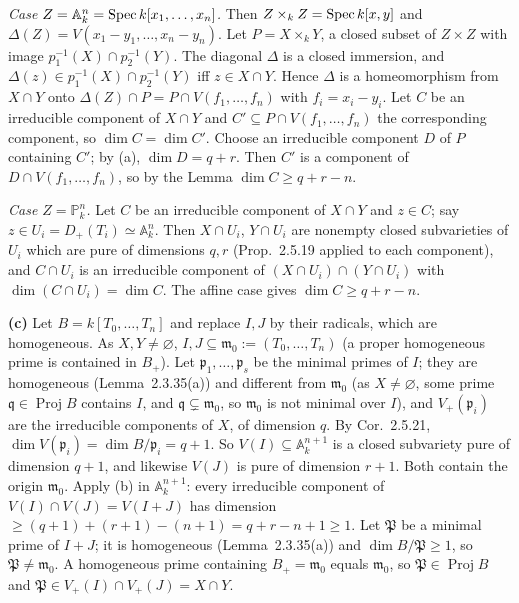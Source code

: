 \documentclass[11pt]{article}
\begin{document}
\emph{Case $Z=\mathbb A^n_k=\operatorname{Spec} k[x_1,\dots,x_n]$.} Then $Z\times_kZ=\operatorname{Spec} k[x,y]$ and $\Delta(Z)=V(x_1-y_1,\dots,x_n-y_n)$. Let $P=X\times_kY$, a closed subset of $Z\times Z$ with image $p_1^{-1}(X)\cap p_2^{-1}(Y)$. The diagonal $\Delta$ is a closed immersion, and $\Delta(z)\in p_1^{-1}(X)\cap p_2^{-1}(Y)$ iff $z\in X\cap Y$. Hence $\Delta$ is a homeomorphism from $X\cap Y$ onto $\Delta(Z)\cap P=P\cap V(f_1,\dots,f_n)$ with $f_i=x_i-y_i$. Let $C$ be an irreducible component of $X\cap Y$ and $C'\subseteq P\cap V(f_1,\dots,f_n)$ the corresponding component, so $\dim C=\dim C'$. Choose an irreducible component $D$ of $P$ containing $C'$; by (a), $\dim D=q+r$. Then $C'$ is a component of $D\cap V(f_1,\dots,f_n)$, so by the Lemma $\dim C\ge q+r-n$.

\emph{Case $Z=\mathbb P^n_k$.} Let $C$ be an irreducible component of $X\cap Y$ and $z\in C$; say $z\in U_i=D_+(T_i)\simeq\mathbb A^n_k$. Then $X\cap U_i$, $Y\cap U_i$ are nonempty closed subvarieties of $U_i$ which are pure of dimensions $q,r$ (Prop.~2.5.19 applied to each component), and $C\cap U_i$ is an irreducible component of $(X\cap U_i)\cap(Y\cap U_i)$ with $\dim(C\cap U_i)=\dim C$. The affine case gives $\dim C\ge q+r-n$.

\textbf{(c)} Let $B=k[T_0,\dots,T_n]$ and replace $I,J$ by their radicals, which are homogeneous. As $X,Y\neq\varnothing$, $I,J\subseteq\mathfrak m_0:=(T_0,\dots,T_n)$ (a proper homogeneous prime is contained in $B_+$). Let $\mathfrak p_1,\dots,\mathfrak p_s$ be the minimal primes of $I$; they are homogeneous (Lemma~2.3.35(a)) and different from $\mathfrak m_0$ (as $X\ne\varnothing$, some prime $\mathfrak q\in\operatorname{Proj}B$ contains $I$, and $\mathfrak q\subsetneq\mathfrak m_0$, so $\mathfrak m_0$ is not minimal over $I$), and $V_+(\mathfrak p_i)$ are the irreducible components of $X$, of dimension $q$. By Cor.~2.5.21, $\dim V(\mathfrak p_i)=\dim B/\mathfrak p_i=q+1$. So $V(I)\subseteq\mathbb A^{n+1}_k$ is a closed subvariety pure of dimension $q+1$, and likewise $V(J)$ is pure of dimension $r+1$. Both contain the origin $\mathfrak m_0$. Apply (b) in $\mathbb A^{n+1}_k$: every irreducible component of $V(I)\cap V(J)=V(I+J)$ has dimension $\ge(q+1)+(r+1)-(n+1)=q+r-n+1\ge1$. Let $\mathfrak P$ be a minimal prime of $I+J$; it is homogeneous (Lemma~2.3.35(a)) and $\dim B/\mathfrak P\ge1$, so $\mathfrak P\ne\mathfrak m_0$. A homogeneous prime containing $B_+=\mathfrak m_0$ equals $\mathfrak m_0$, so $\mathfrak P\in\operatorname{Proj}B$ and $\mathfrak P\in V_+(I)\cap V_+(J)=X\cap Y$.
\end{document}
